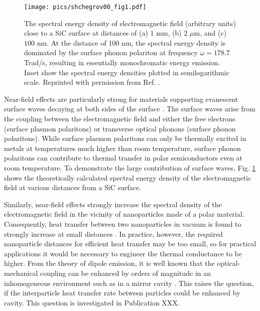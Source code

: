 \begin{figure}
\begin{center}
 \texttt{[image: pics/shchegrov00\_fig1.pdf]}
 \caption{The spectral energy density of electromagnetic field (arbitrary units) close to a SiC surface at distances of (a) $1$ mm, (b) $2$ $\mu$m, and (c) $100$ nm. At the distance of 100 nm, the spectral energy density is dominated by the surface phonon polariton at frequency $\omega=178.7$ Trad/s, resulting in essentially monochromatic energy emission. Inset show the spectral energy densities plotted in semilogarithmic scale. Reprinted with permission from Ref. \cite{shchegrov00}.}
\label{fig:intro_shchegrov}
\end{center}
\end{figure} 

Near-field effects are particularly strong for materials supporting evanescent surface waves decaying at both sides of the surface \cite{shchegrov00}. The surface waves arise from the coupling between the electromagnetic field and either the free electrons (surface plasmon polaritons) or transverse optical phonons (surface phonon polaritons). While surface plasmon polaritons can only be thermally excited in metals at temperatures much higher than room temperature, surface phonon polaritons can contribute to thermal transfer in polar semiconductors even at room temperature. To demonstrate the large contribution of surface waves, Fig. \ref{fig:intro_shchegrov} shows the theoretically calculated \cite{shchegrov00} spectral energy density of the electromagnetic field at various distances from a SiC surface.

Similarly, near-field effects strongly increase the spectral density of the electromagnetic field in the vicinity of nanoparticles made of a polar material. Consequently, heat transfer between two nanoparticles in vacuum is found to strongly increase at small distances \cite{domingues05}. In practice, however, the required nanoparticle distances for efficient heat transfer may be too small, so for practical applications it would be necessary to engineer the thermal conductance to be higher. From the theory of dipole emission, it is well known that the optical-mechanical coupling can be enhanced by orders of magnitude in an inhomogeneous environment such as in a mirror cavity \cite{}. This raises the question, if the interparticle heat transfer rate between particles could be enhanced by cavity. This question is investigated in Publication XXX.




